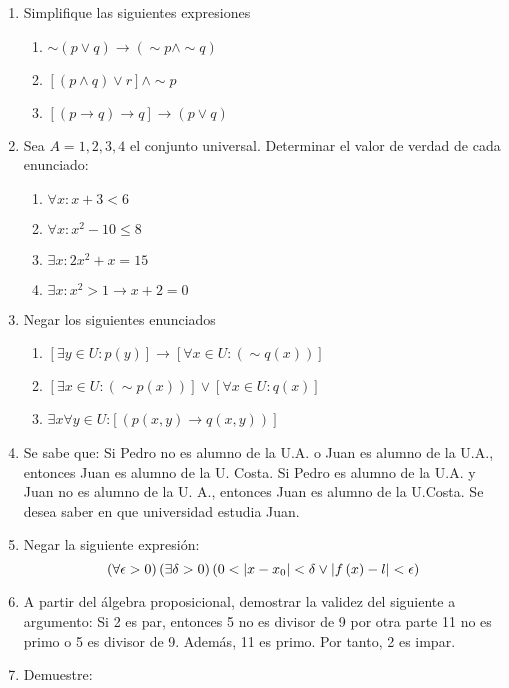 {\begin{enumerate}
\item Simplifique las siguientes expresiones

\begin{enumerate}
\item $\sim\left(p\vee q\right)\rightarrow\left(\sim p\wedge\sim q\right)$
\item $\left[\left(p\wedge q\right)\vee r\right]\wedge\sim p$
\item $\left[\left(p\rightarrow q\right)\rightarrow q\right]\rightarrow\left(p\vee q\right)$
\end{enumerate}
\item Sea $A={1,2,3,4}$ el conjunto universal. Determinar el valor de verdad
de cada enunciado: 

\begin{enumerate}
\item $\forall x:x+3<6$
\item $\forall x:x^{2}-10\leq8$
\item $\exists x:2x^{2}+x=15$
\item $\exists x:x^{2}>1\rightarrow x+2=0$
\end{enumerate}
\item Negar los siguientes enunciados

\begin{enumerate}
\item $\left[\exists y\in U:p\left(y\right)\right]\rightarrow\left[\forall x\in U:\left(\sim q\left(x\right)\right)\right]$
\item $\left[\exists x\in U:\left(\sim p\left(x\right)\right)\right]\vee\left[\forall x\in U:q\left(x\right)\right]$
\item $\exists x\forall y\in U$:$\left[\left(p\left(x,y\right)\rightarrow q\left(x,y\right)\right)\right]$
\end{enumerate}
\item Se sabe que: \medskip{}
Si Pedro no es alumno de la U.A. o Juan es alumno de la U.A., entonces
Juan es alumno de la U. Costa. \medskip{}
Si Pedro es alumno de la U.A. y Juan no es alumno de la U. A., entonces
Juan es alumno de la U.Costa. \medskip{}
Se desea saber en que universidad estudia Juan. 
\item Negar la siguiente expresión:
\[
\mbox{\ensuremath{\left(\forall\epsilon>0\right)\left(\exists\delta>0\right)\left(0<\left|x-x_{0}\right|<\delta\vee\left|f\left(x\right)-l\right|<\epsilon\right)}}
\]

\item A partir del álgebra proposicional, demostrar la validez del siguiente
a argumento:\medskip{}
 Si 2 es par, entonces 5 no es divisor de 9 por otra parte 11 no es
primo o 5 es divisor de 9. Además, 11 es primo. Por tanto, 2 es impar. 
\item Demuestre:


\end{enumerate}}
